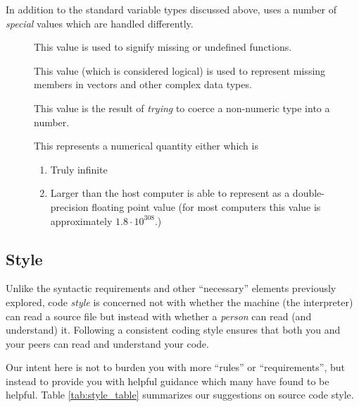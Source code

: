 \documentclass[10pt,letterpaper]{article}
\begin{document}
In addition to the standard variable types discussed above, \R uses a number of \emph{special} values which are handled differently.
\begin{description}
  \item[] This value is used to signify missing or undefined functions.
  \item[] This value (which is considered logical) is used to represent missing members in vectors and other complex data types.
  \item[] This value is the result of \emph{trying} to coerce a non-numeric type into a number.
  \item[] This represents a numerical quantity either which is
  \begin{enumerate}
    \item Truly infinite
    \item Larger than the host computer is able to represent as a double-precision floating point value (for most computers this value is approximately $1.8 \cdot 10^{308}$.)
  \end{enumerate}
\end{description}



\subsection{Style} %
\label{sub:style}

Unlike the syntactic requirements and other ``necessary'' elements previously explored, code \emph{style} is concerned not with whether the machine (the \R interpreter) can read a source file but instead with whether a \emph{person} can read (and understand) it.  Following a consistent coding style ensures that both you and your peers can read and understand your code.

Our intent here is not to burden you with more ``rules'' or ``requirements'', but instead to provide you with helpful guidance which many have found to be helpful.  Table \ref{tab:style_table} summarizes our suggestions on \R source code style.
\end{document}
